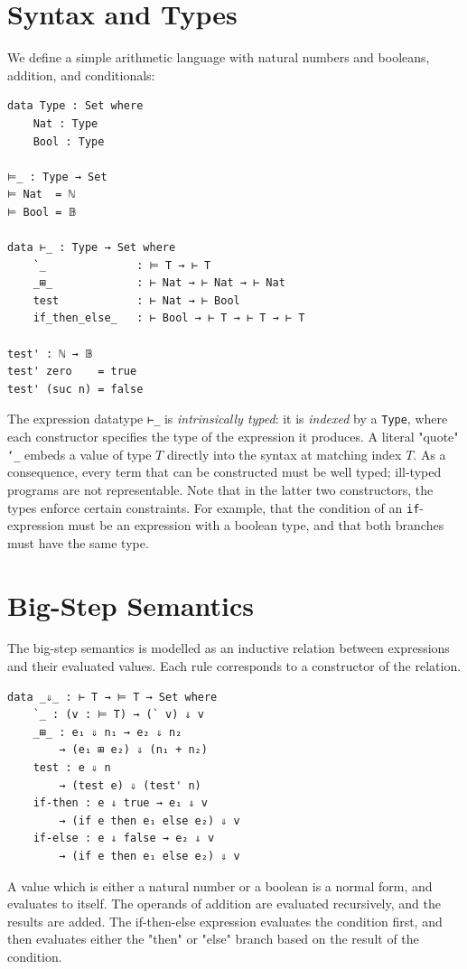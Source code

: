 \section{Syntax and Types}

We define a simple arithmetic language with natural numbers and booleans, addition, and conditionals:
\begin{verbatim}
data Type : Set where
    Nat : Type
    Bool : Type

⊨_ : Type → Set
⊨ Nat  = ℕ
⊨ Bool = 𝔹

data ⊢_ : Type → Set where
    `_              : ⊨ T → ⊢ T
    _⊞_             : ⊢ Nat → ⊢ Nat → ⊢ Nat
    test            : ⊢ Nat → ⊢ Bool
    if_then_else_   : ⊢ Bool → ⊢ T → ⊢ T → ⊢ T

test' : ℕ → 𝔹
test' zero    = true
test' (suc n) = false
\end{verbatim}

The expression datatype \texttt{⊢\_} is \textit{intrinsically typed}: it is \textit{indexed} by a \texttt{Type}, where each constructor specifies the type of the expression it produces.
A literal "quote" \texttt{`\_} embeds a value of type $T$ directly into the syntax at matching index $T$.
As a consequence, every term that can be constructed must be well typed; ill-typed programs are not representable.
Note that in the latter two constructors, the types enforce certain constraints. For example, that the condition of an \texttt{if}-expression must be an expression with a boolean type, and that both branches must have the same type.

\section{Big-Step Semantics}

The big-step semantics is modelled as an inductive relation between expressions and their evaluated values.
Each rule corresponds to a constructor of the relation.

\begin{verbatim}
data _⇓_ : ⊢ T → ⊨ T → Set where
    `_ : (v : ⊨ T) → (` v) ⇓ v
    _⊞_ : e₁ ⇓ n₁ → e₂ ⇓ n₂ 
        → (e₁ ⊞ e₂) ⇓ (n₁ + n₂)
    test : e ⇓ n 
        → (test e) ⇓ (test' n)
    if-then : e ⇓ true → e₁ ⇓ v 
        → (if e then e₁ else e₂) ⇓ v
    if-else : e ⇓ false → e₂ ⇓ v 
        → (if e then e₁ else e₂) ⇓ v
\end{verbatim}

A value which is either a natural number or a boolean is a normal form, and evaluates to itself.
The operands of addition are evaluated recursively, and the results are added.
The if-then-else expression evaluates the condition first, and then evaluates either the "then" or "else" branch based on the result of the condition.


